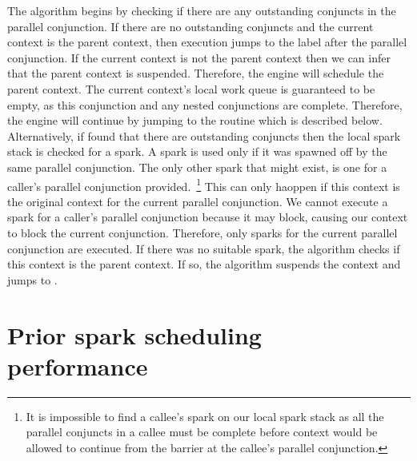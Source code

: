 The algorithm begins by checking if there are any outstanding conjuncts in
the parallel conjunction.
If there are no outstanding conjuncts and the current context is the parent
context,
then execution jumps to the label after the parallel conjunction.
If the current context is not the parent context then
we can infer that the parent context is suspended.
Therefore,
the engine will schedule the parent context.
The current context's local work queue is guaranteed to be empty,
as this conjunction and any nested conjunctions are complete.
Therefore,
the engine will continue by jumping to the \getglobalwork routine
which is described below.
Alternatively,
if \joinandcontinue found that there are outstanding conjuncts then
the local spark stack is checked for a spark.
A spark is used only if it was spawned off by the same parallel conjunction.
The only other spark that might exist, is one for a caller's parallel
conjunction provided.~\footnote{
    It is impossible to find a callee's spark on our local spark stack as
    all the parallel conjuncts in a callee must be complete before context
    would be allowed to continue from the barrier at the callee's parallel
    conjunction.}
This can only haoppen if this context is the original context for the
current parallel conjunction.
We cannot execute a spark for a caller's parallel conjunction because it may
block, causing our context to block the current conjunction.
Therefore, only sparks for the current parallel conjunction are executed.
If there was no suitable spark,
the algorithm checks if this context is the parent context.
If so, the algorithm suspends the context and
jumps to \getglobalwork.



\section{Prior spark scheduling performance}
\label{sec:old_scheduling_performance}

